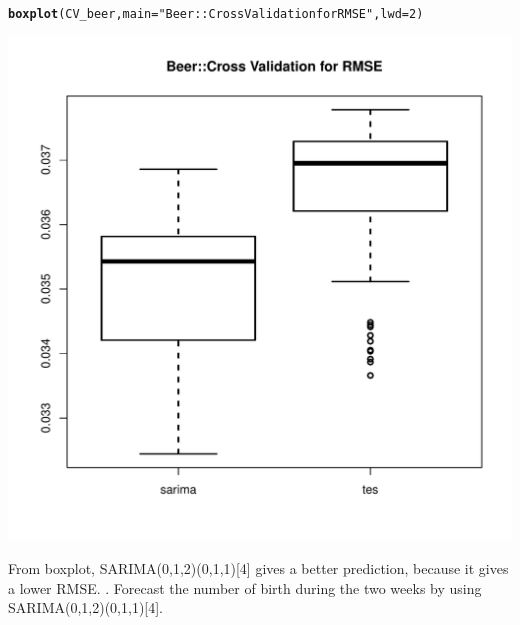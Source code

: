 \documentclass[10pt]{article}\usepackage[]{graphicx}\usepackage[]{color}
\makeatletter
\def\maxwidth{ %
  \ifdim\Gin@nat@width>\linewidth
    \linewidth
  \else
    \Gin@nat@width
  \fi
}
\newcommand{\hlnum}[1]{\textcolor[rgb]{0.686,0.059,0.569}{#1}}%
\newcommand{\hlstr}[1]{\textcolor[rgb]{0.192,0.494,0.8}{#1}}%
\newcommand{\hlstd}[1]{\textcolor[rgb]{0.345,0.345,0.345}{#1}}%
\newcommand{\hlkwc}[1]{\textcolor[rgb]{0.333,0.667,0.333}{#1}}%
\newcommand{\hlkwd}[1]{\textcolor[rgb]{0.737,0.353,0.396}{\textbf{#1}}}%
\newenvironment{kframe}{%
 \def\at@end@of@kframe{}%
 \ifinner\ifhmode%
  \def\at@end@of@kframe{\end{minipage}}%
  \begin{minipage}{\columnwidth}%
 \fi\fi%
 \def\FrameCommand##1{\hskip\@totalleftmargin \hskip-\fboxsep
 \colorbox{shadecolor}{##1}\hskip-\fboxsep
     \hskip-\linewidth \hskip-\@totalleftmargin \hskip\columnwidth}%
 \MakeFramed {\advance\hsize-\width
   \@totalleftmargin\z@ \linewidth\hsize
   \@setminipage}}%
 {\par\unskip\endMakeFramed%
 \at@end@of@kframe}
\newenvironment{knitrout}{}{} %
\makeatother
\begin{document}
\begin{knitrout}
\begin{kframe}
\begin{alltt}
\hlkwd{boxplot}\hlstd{(CV_beer,}\hlkwc{main} \hlstd{=} \hlstr{"Beer::Cross Validation for RMSE"}\hlstd{,} \hlkwc{lwd}\hlstd{=}\hlnum{2}\hlstd{)}
\end{alltt}
\end{kframe}
\includegraphics[width=\maxwidth]{figure/unnamed-chunk-22-1} 

\end{knitrout}

From boxplot, SARIMA(0,1,2)(0,1,1)[4] gives a better prediction, because it gives a lower RMSE.
. Forecast the number of birth during the two weeks by using SARIMA(0,1,2)(0,1,1)[4].
\end{document}
